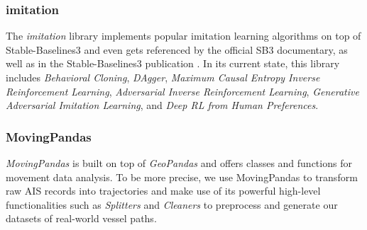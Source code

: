 \subsubsection{imitation}
The \textit{imitation} library \cite[]{wang2020imitation} implements popular imitation learning algorithms on top of Stable-Baselines3 and even gets referenced by the official SB3 documentary, as well as in the Stable-Baselines3 publication \cite[p.~2]{stable-baselines3}. In its current state, this library includes \textit{Behavioral Cloning}, \textit{DAgger}, \textit{Maximum Causal Entropy Inverse Reinforcement Learning}, \textit{Adversarial Inverse Reinforcement Learning}, \textit{Generative Adversarial Imitation Learning}, and \textit{Deep RL from Human Preferences}.

\subsubsection{MovingPandas}\label{subchap:movingPandas}
\textit{MovingPandas} \cite[]{graser2019movingpandas} is built on top of \textit{GeoPandas} \cite[]{kelsey_jordahl_2020_3946761} and offers classes and functions for movement data analysis. To be more precise, we use MovingPandas to transform raw AIS records into trajectories and make use of its powerful high-level functionalities such as \textit{Splitters} and \textit{Cleaners} to preprocess and generate our datasets of real-world vessel paths.
